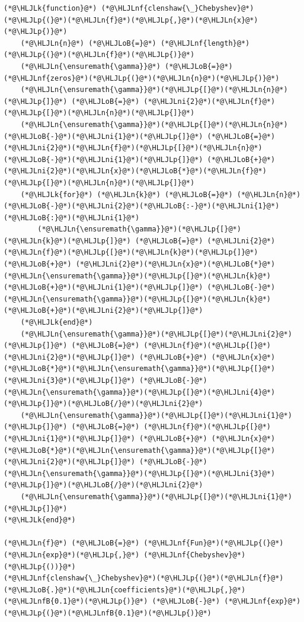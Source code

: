 \documentclass[12pt,a4paper]{article}
\newcommand{\HLJLk}[1]{\textcolor[RGB]{148,91,176}{\textbf{#1}}}
\newcommand{\HLJLn}[1]{#1}
\newcommand{\HLJLnf}[1]{\textcolor[RGB]{66,102,213}{#1}}
\newcommand{\HLJLnfB}[1]{\textcolor[RGB]{59,151,46}{#1}}
\newcommand{\HLJLni}[1]{\textcolor[RGB]{59,151,46}{#1}}
\newcommand{\HLJLoB}[1]{\textcolor[RGB]{102,102,102}{\textbf{#1}}}
\newcommand{\HLJLp}[1]{#1}
\begin{document}
\begin{lstlisting}
(*@\HLJLk{function}@*) (*@\HLJLnf{clenshaw{\_}Chebyshev}@*)(*@\HLJLp{(}@*)(*@\HLJLn{f}@*)(*@\HLJLp{,}@*)(*@\HLJLn{x}@*)(*@\HLJLp{)}@*)
    (*@\HLJLn{n}@*) (*@\HLJLoB{=}@*) (*@\HLJLnf{length}@*)(*@\HLJLp{(}@*)(*@\HLJLn{f}@*)(*@\HLJLp{)}@*)
    (*@\HLJLn{\ensuremath{\gamma}}@*) (*@\HLJLoB{=}@*) (*@\HLJLnf{zeros}@*)(*@\HLJLp{(}@*)(*@\HLJLn{n}@*)(*@\HLJLp{)}@*)
    (*@\HLJLn{\ensuremath{\gamma}}@*)(*@\HLJLp{[}@*)(*@\HLJLn{n}@*)(*@\HLJLp{]}@*) (*@\HLJLoB{=}@*) (*@\HLJLni{2}@*)(*@\HLJLn{f}@*)(*@\HLJLp{[}@*)(*@\HLJLn{n}@*)(*@\HLJLp{]}@*)
    (*@\HLJLn{\ensuremath{\gamma}}@*)(*@\HLJLp{[}@*)(*@\HLJLn{n}@*)(*@\HLJLoB{-}@*)(*@\HLJLni{1}@*)(*@\HLJLp{]}@*) (*@\HLJLoB{=}@*) (*@\HLJLni{2}@*)(*@\HLJLn{f}@*)(*@\HLJLp{[}@*)(*@\HLJLn{n}@*)(*@\HLJLoB{-}@*)(*@\HLJLni{1}@*)(*@\HLJLp{]}@*) (*@\HLJLoB{+}@*)(*@\HLJLni{2}@*)(*@\HLJLn{x}@*)(*@\HLJLoB{*}@*)(*@\HLJLn{f}@*)(*@\HLJLp{[}@*)(*@\HLJLn{n}@*)(*@\HLJLp{]}@*)
    (*@\HLJLk{for}@*) (*@\HLJLn{k}@*) (*@\HLJLoB{=}@*) (*@\HLJLn{n}@*)(*@\HLJLoB{-}@*)(*@\HLJLni{2}@*)(*@\HLJLoB{:-}@*)(*@\HLJLni{1}@*)(*@\HLJLoB{:}@*)(*@\HLJLni{1}@*)
        (*@\HLJLn{\ensuremath{\gamma}}@*)(*@\HLJLp{[}@*)(*@\HLJLn{k}@*)(*@\HLJLp{]}@*) (*@\HLJLoB{=}@*) (*@\HLJLni{2}@*)(*@\HLJLn{f}@*)(*@\HLJLp{[}@*)(*@\HLJLn{k}@*)(*@\HLJLp{]}@*) (*@\HLJLoB{+}@*) (*@\HLJLni{2}@*)(*@\HLJLn{x}@*)(*@\HLJLoB{*}@*)(*@\HLJLn{\ensuremath{\gamma}}@*)(*@\HLJLp{[}@*)(*@\HLJLn{k}@*)(*@\HLJLoB{+}@*)(*@\HLJLni{1}@*)(*@\HLJLp{]}@*) (*@\HLJLoB{-}@*) (*@\HLJLn{\ensuremath{\gamma}}@*)(*@\HLJLp{[}@*)(*@\HLJLn{k}@*)(*@\HLJLoB{+}@*)(*@\HLJLni{2}@*)(*@\HLJLp{]}@*)
    (*@\HLJLk{end}@*)
    (*@\HLJLn{\ensuremath{\gamma}}@*)(*@\HLJLp{[}@*)(*@\HLJLni{2}@*)(*@\HLJLp{]}@*) (*@\HLJLoB{=}@*) (*@\HLJLn{f}@*)(*@\HLJLp{[}@*)(*@\HLJLni{2}@*)(*@\HLJLp{]}@*) (*@\HLJLoB{+}@*) (*@\HLJLn{x}@*)(*@\HLJLoB{*}@*)(*@\HLJLn{\ensuremath{\gamma}}@*)(*@\HLJLp{[}@*)(*@\HLJLni{3}@*)(*@\HLJLp{]}@*) (*@\HLJLoB{-}@*) (*@\HLJLn{\ensuremath{\gamma}}@*)(*@\HLJLp{[}@*)(*@\HLJLni{4}@*)(*@\HLJLp{]}@*)(*@\HLJLoB{/}@*)(*@\HLJLni{2}@*)
    (*@\HLJLn{\ensuremath{\gamma}}@*)(*@\HLJLp{[}@*)(*@\HLJLni{1}@*)(*@\HLJLp{]}@*) (*@\HLJLoB{=}@*) (*@\HLJLn{f}@*)(*@\HLJLp{[}@*)(*@\HLJLni{1}@*)(*@\HLJLp{]}@*) (*@\HLJLoB{+}@*) (*@\HLJLn{x}@*)(*@\HLJLoB{*}@*)(*@\HLJLn{\ensuremath{\gamma}}@*)(*@\HLJLp{[}@*)(*@\HLJLni{2}@*)(*@\HLJLp{]}@*) (*@\HLJLoB{-}@*) (*@\HLJLn{\ensuremath{\gamma}}@*)(*@\HLJLp{[}@*)(*@\HLJLni{3}@*)(*@\HLJLp{]}@*)(*@\HLJLoB{/}@*)(*@\HLJLni{2}@*)    
    (*@\HLJLn{\ensuremath{\gamma}}@*)(*@\HLJLp{[}@*)(*@\HLJLni{1}@*)(*@\HLJLp{]}@*)
(*@\HLJLk{end}@*)

(*@\HLJLn{f}@*) (*@\HLJLoB{=}@*) (*@\HLJLnf{Fun}@*)(*@\HLJLp{(}@*)(*@\HLJLn{exp}@*)(*@\HLJLp{,}@*) (*@\HLJLnf{Chebyshev}@*)(*@\HLJLp{())}@*)
(*@\HLJLnf{clenshaw{\_}Chebyshev}@*)(*@\HLJLp{(}@*)(*@\HLJLn{f}@*)(*@\HLJLoB{.}@*)(*@\HLJLn{coefficients}@*)(*@\HLJLp{,}@*) (*@\HLJLnfB{0.1}@*)(*@\HLJLp{)}@*) (*@\HLJLoB{-}@*) (*@\HLJLnf{exp}@*)(*@\HLJLp{(}@*)(*@\HLJLnfB{0.1}@*)(*@\HLJLp{)}@*)
\end{lstlisting}
\end{document}
